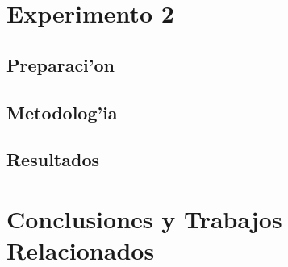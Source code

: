 \documentclass[a4paper,11pt,twocolumns]{article}
\begin{document}
\section{Experimento 2}

\subsection{Preparaci'on}

\subsection{Metodolog'ia}

\subsection{Resultados}

\section{Conclusiones y Trabajos Relacionados}

\nocite{*}

\end{document}
